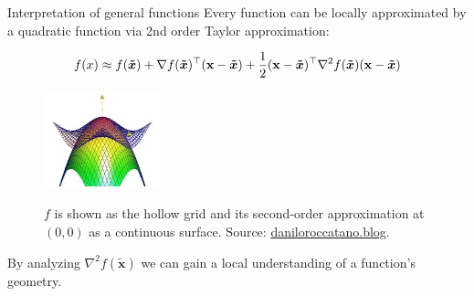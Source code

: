   \begin{vbframe}{Interpretation of general functions}
  Every function can be locally approximated by a quadratic function via 2nd order Taylor approximation: 
  
  \vspace*{-0.3cm}
  
  $$
  f(x) \approx f(\bm{\tilde{x}}) + \nabla f(\bm{\tilde{x}})^\top(\mathbf{x}-\bm{\tilde{x}}) +
  \frac 12(\mathbf{x}-\bm{\tilde{x}})^\top\nabla^2 f(\bm{\tilde{x}})(\mathbf{x}-\bm{\tilde{x}})
  $$
  
  \begin{figure}
    \includegraphics[width=0.3\textwidth]{figure_man/taylor_2D_quadratic.png} \\
    \begin{footnotesize} 
    $f$ is shown as the hollow grid and its second-order approximation at $(0, 0)$ as a continuous surface. Source: \url{daniloroccatano.blog}. 
    \end{footnotesize}
  \end{figure}
  
  By analyzing $\nabla^2 f(\bm{\tilde{x}})$ we can gain a local understanding of a function's geometry. 
  
  \end{vbframe}
  
  
  
  \endlecture

  
  
